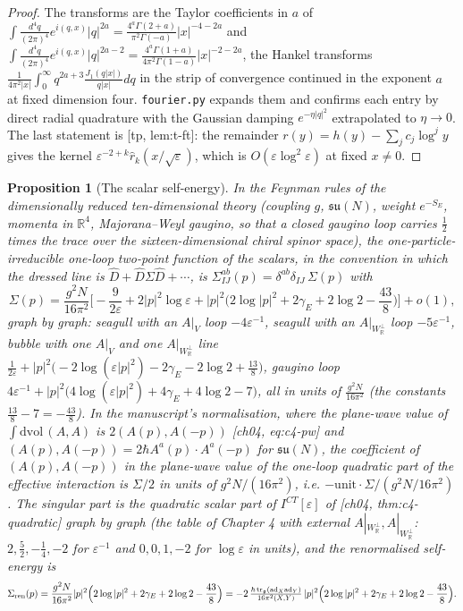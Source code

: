 \documentclass[11pt]{article}
\theoremstyle{plain}
\newtheorem{proposition}[theorem]{Proposition}
\theoremstyle{definition}
\numberwithin{equation}{section}
\newcommand{\unit}{\tfrac{\hbar\operatorname{tr}_{\mathfrak g}(\mathrm{ad}_X\mathrm{ad}_Y)}{16\pi^2(X,Y)}}
\newcommand{\Wp}{W_{\mathbb R}^\perp}
\begin{document}
\begin{proof}
The transforms are the Taylor coefficients in $a$ of $\int\frac{d^4q}{(2\pi)^4}e^{i(q,x)}|q|^{2a}=\frac{4^a\Gamma(2+a)}{\pi^2\Gamma(-a)}|x|^{-4-2a}$ and $\int\frac{d^4q}{(2\pi)^4}e^{i(q,x)}|q|^{2a-2}=\frac{4^a\Gamma(1+a)}{4\pi^2\Gamma(1-a)}|x|^{-2-2a}$, the Hankel transforms $\frac{1}{4\pi^2|x|}\int_0^\infty q^{2a+3}\frac{J_1(q|x|)}{q|x|}dq$ in the strip of convergence continued in the exponent $a$ at fixed dimension four. \texttt{fourier.py} expands them and confirms each entry by direct radial quadrature with the Gaussian damping $e^{-\eta|q|^2}$ extrapolated to $\eta\to0$. The last statement is [tp, lem:t-ft]: the remainder $r(y)=h(y)-\sum_jc_j\log^jy$ gives the kernel $\varepsilon^{-2+k}\hat r_k(x/\sqrt\varepsilon)$, which is $O(\varepsilon\log^2\varepsilon)$ at fixed $x\ne0$.
\end{proof}

\begin{proposition}[The scalar self-energy]
\label{prop:selfenergy}
In the Feynman rules of the dimensionally reduced ten-dimensional theory (coupling $g$, $\mathfrak{su}(N)$, weight $e^{-S_E}$, momenta in $\mathbb R^4$, Majorana--Weyl gaugino, so that a closed gaugino loop carries $\tfrac12$ times the trace over the sixteen-dimensional chiral spinor space), the one-particle-irreducible one-loop two-point function of the scalars, in the convention in which the dressed line is $\hat D+\hat D\Sigma\hat D+\cdots$, is $\Sigma^{ab}_{IJ}(p)=\delta^{ab}\delta_{IJ}\,\Sigma(p)$ with
\[
\Sigma(p)=\frac{g^2N}{16\pi^2}\Big[-\frac{9}{2\varepsilon}+2|p|^2\log\varepsilon+|p|^2\Big(2\log|p|^2+2\gamma_E+2\log2-\frac{43}8\Big)\Big]+o(1),
\]
graph by graph: seagull with an $A|_V$ loop $-4\varepsilon^{-1}$, seagull with an $A|_{\Wp}$ loop $-5\varepsilon^{-1}$, bubble with one $A|_V$ and one $A|_{\Wp}$ line $\tfrac1{2\varepsilon}+|p|^2\big(-2\log(\varepsilon|p|^2)-2\gamma_E-2\log2+\tfrac{13}{8}\big)$, gaugino loop $4\varepsilon^{-1}+|p|^2\big(4\log(\varepsilon|p|^2)+4\gamma_E+4\log2-7\big)$, all in units of $\frac{g^2N}{16\pi^2}$ (the constants $\tfrac{13}8-7=-\tfrac{43}8$). In the manuscript's normalisation, where the plane-wave value of $\int\mathrm{dvol}\,(A,A)$ is $2(A(p),A(-p))$ [ch04, eq:c4-pw] and $(A(p),A(-p))=2\hbar A^a(p)\cdot A^a(-p)$ for $\mathfrak{su}(N)$, the coefficient of $(A(p),A(-p))$ in the plane-wave value of the one-loop quadratic part of the effective interaction is $\Sigma/2$ in units of $g^2N/(16\pi^2)$, i.e. $-\mathrm{unit}\cdot\Sigma/(g^2N/16\pi^2)$. The singular part is the quadratic scalar part of $I^{CT}[\varepsilon]$ of [ch04, thm:c4-quadratic] graph by graph (the table of Chapter 4 with external $A|_{\Wp},A|_{\Wp}$: $2,\tfrac52,-\tfrac14,-2$ for $\varepsilon^{-1}$ and $0,0,1,-2$ for $\log\varepsilon$ in units), and the renormalised self-energy is
\[
\Sigma_{\rm ren}(p)=\frac{g^2N}{16\pi^2}|p|^2\Big(2\log|p|^2+2\gamma_E+2\log2-\frac{43}8\Big)=-2\,\unit\,|p|^2\Big(2\log|p|^2+2\gamma_E+2\log2-\frac{43}8\Big).
\]
\end{proposition}
\end{document}
